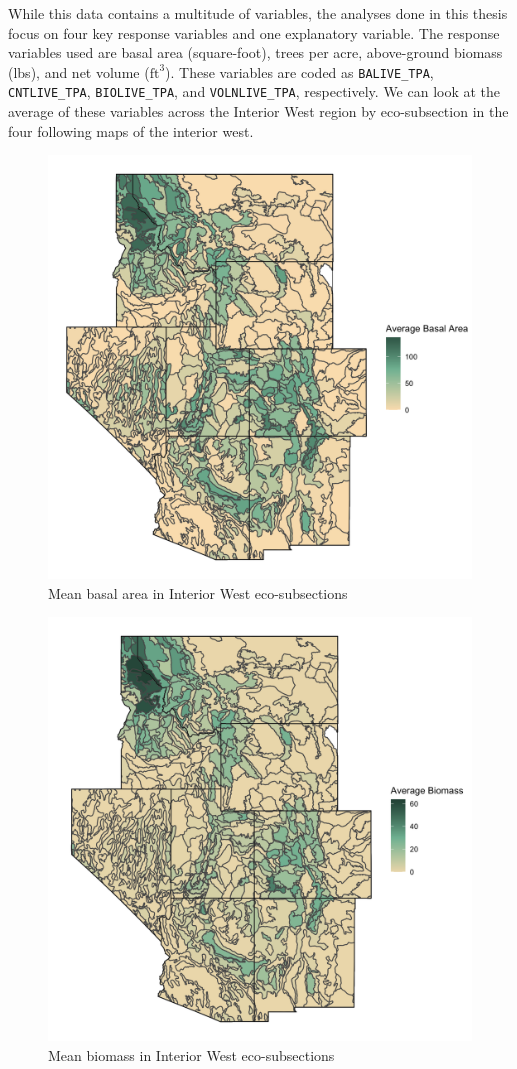 \documentclass[12pt,twoside]{reedthesis}
\begin{document}
While this data contains a multitude of variables, the analyses done in this thesis focus on four key response variables and one explanatory variable. The response variables used are basal area (square-foot), trees per acre, above-ground biomass (lbs), and net volume (\(\text{ft}^3\)). These variables are coded as \texttt{BALIVE\_TPA}, \texttt{CNTLIVE\_TPA}, \texttt{BIOLIVE\_TPA}, and \texttt{VOLNLIVE\_TPA}, respectively. We can look at the average of these variables across the Interior West region by eco-subsection in the four following maps of the interior west.
\begin{figure}

{\centering \includegraphics[width=0.65\linewidth]{figure/basal} 

}

\caption{Mean basal area in Interior West eco-subsections}\label{fig:unnamed-chunk-6}
\end{figure}
\begin{figure}

{\centering \includegraphics[width=0.65\linewidth]{figure/biomass} 

}

\caption{Mean biomass in Interior West eco-subsections}\label{fig:unnamed-chunk-7}
\end{figure}
\end{document}
